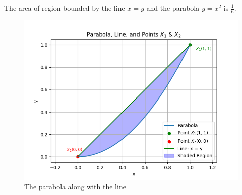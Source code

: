 \documentclass[journal]{IEEEtran}
\begin{document}
The area of region bounded by the line $x=y$ and the parabola $y=x^2$ is $\frac{1}{6}$.
\begin{figure}[h!]
   \centering
   \includegraphics[width = 1\linewidth]{figs/fig.png}
   \caption{The parabola along with the line}
   \label{stemplot}
\end{figure}
\end{document}
